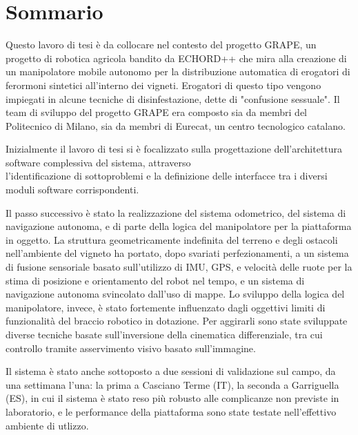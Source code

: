 \chapter*{Sommario}
Questo lavoro di tesi è da collocare nel contesto del progetto \ac{GRAPE}, un progetto di robotica agricola bandito da \ac{ECHORD++} che mira alla creazione di un manipolatore mobile autonomo per la distribuzione automatica di erogatori di ferormoni sintetici all'interno dei vigneti. Erogatori di questo tipo vengono impiegati in alcune tecniche di disinfestazione, dette di "confusione sessuale".
Il team di sviluppo del progetto \ac{GRAPE} era composto sia da membri del Politecnico di Milano, sia da membri di Eurecat, un centro tecnologico catalano.
\par Inizialmente il lavoro di tesi si è focalizzato sulla progettazione dell'architettura software complessiva del sistema, attraverso \\l'identificazione di sottoproblemi e la definizione delle interfacce  tra i diversi moduli software corrispondenti.
\par Il passo successivo è stato la realizzazione del sistema odometrico, del sistema di navigazione autonoma, e di parte della logica del manipolatore per la piattaforma in oggetto. 
La struttura geometricamente indefinita del terreno e degli ostacoli nell'ambiente del vigneto ha portato, dopo svariati perfezionamenti, a un sistema di fusione sensoriale basato sull'utilizzo di \ac{IMU}, GPS, e velocità delle ruote per la stima di posizione e orientamento del robot nel tempo, e un sistema di navigazione autonoma svincolato dall'uso di mappe. Lo sviluppo della logica del manipolatore, invece, è stato fortemente influenzato dagli oggettivi limiti di funzionalità del braccio robotico in dotazione. Per aggirarli sono state sviluppate diverse tecniche basate sull'inversione della cinematica differenziale, tra cui controllo tramite asservimento visivo basato sull'immagine.
\par Il sistema è stato anche sottoposto a due sessioni di validazione sul campo, da una settimana l'una: la prima a Casciano Terme (IT), la seconda a Garriguella (ES), in cui il sistema è stato reso più robusto alle complicanze non previste in laboratorio, e le performance della piattaforma sono state testate nell'effettivo ambiente di utlizzo.

\endgroup











